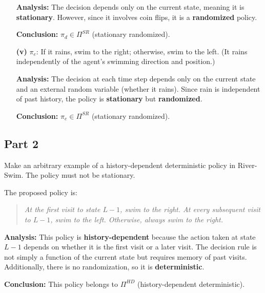 \begin{enumerate}
    \textbf{Analysis:} The decision depends only on the current state, meaning it is \textbf{stationary}. However, since it involves coin flips, it is a \textbf{randomized} policy.

    \textbf{Conclusion:} \(\pi_d \in \Pi^{SR}\) (stationary randomized).

    \item[\textbf{(v)}] \(\pi_e\):  If it rains, swim to the right; otherwise, swim to the left. (It rains independently of the agent’s swimming direction and position.)

    \textbf{Analysis:} The decision at each time step depends only on the current state and an external random variable (whether it rains). Since rain is independent of past history, the policy is \textbf{stationary} but \textbf{randomized}.

    \textbf{Conclusion:} \(\pi_e \in \Pi^{SR}\) (stationary randomized).

\end{enumerate}

\subsection*{Part 2}

Make an arbitrary example of a history-dependent deterministic policy in River-Swim. The policy must not be stationary.

The proposed policy is:

\begin{quote}
\textit{At the first visit to state \( L-1 \), swim to the right. At every subsequent visit to \( L-1 \), swim to the left. Otherwise, always swim to the right.}
\end{quote}

\textbf{Analysis:} This policy is \textbf{history-dependent} because the action taken at state \( L-1 \) depends on whether it is the first visit or a later visit. The decision rule is not simply a function of the current state but requires memory of past visits. Additionally, there is no randomization, so it is \textbf{deterministic}.

\textbf{Conclusion:} This policy belongs to \( \Pi^{HD} \) (history-dependent deterministic).